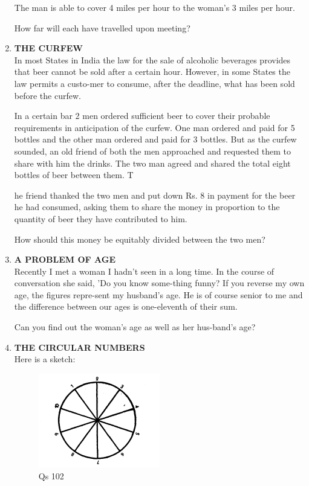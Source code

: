 \documentclass[12pt]{article}
\begin{document}
\begin{enumerate}
The man  is able  to cover  4 miles  per  hour  to the woman's  3 miles  per hour. 

How  far will each  have  travelled  upon  meeting?
%
\item \textbf{THE  CURFEW} \\
In most  States  in India  the  law for the sale  of alcoholic beverages  provides  that  beer  cannot  be sold  after  a certain hour.  However,  in some  States  the law permits  a custo-mer to consume,  after  the deadline,  what  has  been  sold before  the curfew. 

In a certain  bar 2 men  ordered  sufficient  beer  to cover their probable  requirements  in anticipation  of the  curfew. One man  ordered  and  paid  for  5 bottles  and the other man ordered  and  paid  for 3 bottles.  But  as the  curfew sounded,  an old  friend  of both  the men  approached  and requested  them  to share  with  him  the  drinks.  The  two man agreed  and shared  the total  eight  bottles  of beer  between  them. T

he friend  thanked  the two men  and  put  down  Rs. 8 in payment  for the beer  he had consumed,  asking  them  to share  the money  in proportion  to the quantity  of beer  they have  contributed  to him. 

How  should  this money  be equitably  divided  between the two men?
%
\item \textbf{A  PROBLEM  OF AGE} \\
Recently  I met a woman  I hadn't  seen  in a long  time.  In the course  of conversation  she said,  'Do  you know  some-thing  funny?  If you reverse  my own  age,  the figures  repre-sent my husband's  age.  He is of course  senior  to me and the difference  between  our ages  is one-eleventh  of their  sum. 

Can you find  out the woman's  age as well  as her hus-band's  age? 

\item \textbf{THE  CIRCULAR  NUMBERS} \\
Here  is a sketch: 

\begin{figure}[h]
\begin{center}
\includegraphics[width=0.5\textwidth]{sdevi_q102.png}
\caption{ Qs 102}
\end{center}
\end{figure}


\end{enumerate}
\end{document}

